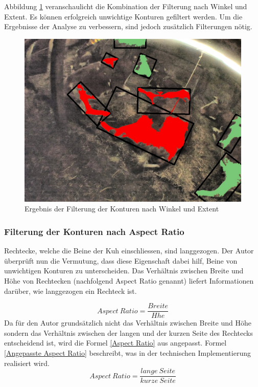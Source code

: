 Abbildung \ref{fig: Ergebnis der Filterung der Konturen nach Winkel und Extent } veranschaulicht die Kombination der Filterung nach Winkel und Extent. Es können erfolgreich unwichtige Konturen gefiltert werden. Um die Ergebnisse der Analyse zu verbessern, sind jedoch zusätzlich Filterungen nötig.
\begin{figure}[H]
	\center
	\includegraphics[scale=0.43]{Grafiken/entwicklung/24FilteringExtentAngle.jpg}
	\caption{Ergebnis der Filterung der Konturen nach Winkel und Extent  } 
	\label{fig: Ergebnis der Filterung der Konturen nach Winkel und Extent } 
\end{figure}

\subsubsection{Filterung der Konturen nach Aspect Ratio}

Rechtecke, welche die Beine der Kuh einschliessen, sind langgezogen. Der Autor überprüft nun die Vermutung, dass diese Eigenschaft dabei hilf, Beine von unwichtigen Konturen zu unterscheiden. Das Verhältnis zwischen Breite und Höhe von Rechtecken (nachfolgend Aspect Ratio genannt) liefert Informationen darüber, wie langgezogen ein Rechteck ist.	
	
\begin{equation}\label{Aspect Ratio}
Aspect\ Ratio =  \frac{Breite}{H\ddot{}he}  
\end{equation}
Da für den Autor grundsätzlich nicht das Verhältnis zwischen Breite und Höhe sondern das Verhältnis zwischen der langen und der kurzen Seite des Rechtecks entscheidend ist, wird die Formel \ref{Aspect Ratio} aus angepasst. Formel \ref{Angepasste Aspect Ratio} beschreibt, was in der technischen Implementierung realisiert wird.
\begin{equation}\label{Angepasste Aspect Ratio}
Aspect\ Ratio =  \frac{lange \ Seite}{kurze \ Seite}  
\end{equation}

